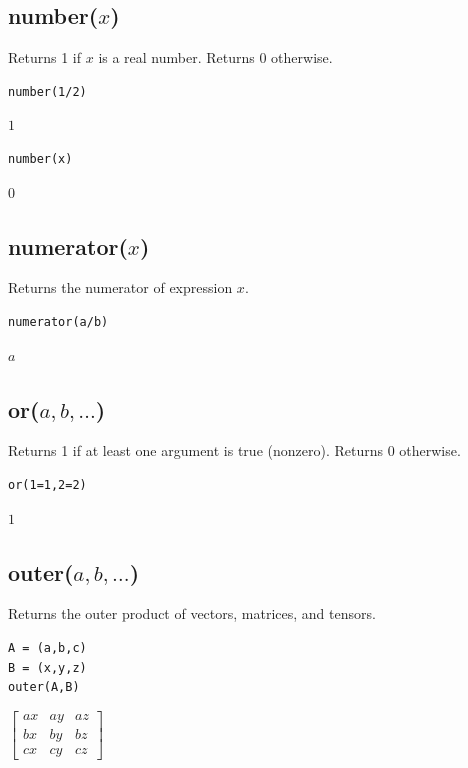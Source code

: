 \documentclass[12pt]{article}
\begin{document}
\subsection*{number($x$)}

Returns 1 if $x$ is a real number.
Returns 0 otherwise.

{\color{blue}
\begin{verbatim}
number(1/2)
\end{verbatim}
}

$1$

{\color{blue}
\begin{verbatim}
number(x)
\end{verbatim}
}

$0$

\subsection*{numerator($x$)}

Returns the numerator of expression $x$.

{\color{blue}
\begin{verbatim}
numerator(a/b)
\end{verbatim}
}

$a$

\subsection*{or($a,b,\ldots$)}

Returns 1 if at least one argument is true (nonzero).
Returns 0 otherwise.

{\color{blue}
\begin{verbatim}
or(1=1,2=2)
\end{verbatim}
}

$1$

\subsection*{outer($a,b,\ldots$)}

Returns the outer product of vectors, matrices, and tensors.

{\color{blue}
\begin{verbatim}
A = (a,b,c)
B = (x,y,z)
outer(A,B)
\end{verbatim}
}

$\displaystyle
\begin{bmatrix}
a x & a y & a z
\\[1ex]
b x & b y & b z
\\[1ex]
c x & c y & c z
\end{bmatrix}
$
\end{document}
